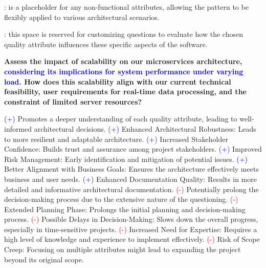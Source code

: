 : is a placeholder for any non-functional attributes, allowing the pattern to be flexibly applied to various architectural scenarios.

: this space is reserved for customizing questions to evaluate how the chosen quality attribute influences these specific aspects of the software.
       
 \textbf{\textcolor{mycolorgreen}{Assess the impact of scalability on our microservices architecture}, \textcolor{blue}{considering its implications for system performance under varying load.} How does this scalability align with our current technical feasibility, user requirements for real-time data processing, and the constraint of limited server resources?}

\newline
\textcolor{blue}{(+)} Promotes a deeper understanding of each quality attribute, leading to well-informed architectural decisions. \newline
\textcolor{blue}{(+)} Enhanced Architectural Robustness: Leads to more resilient and adaptable architecture. \newline
\textcolor{blue}{(+)} Increased Stakeholder Confidence: Builds trust and assurance among project stakeholders. \newline
\textcolor{blue}{(+)} Improved Risk Management: Early identification and mitigation of potential issues. \newline
\textcolor{blue}{(+)} Better Alignment with Business Goals: Ensures the architecture effectively meets business and user needs. \newline
\textcolor{blue}{(+)} Enhanced Documentation Quality: Results in more detailed and informative architectural documentation. \newline
\textcolor{red}{(-)} Potentially prolong the decision-making process due to the extensive nature of the questioning. \newline
\textcolor{red}{(-)} Extended Planning Phase: Prolongs the initial planning and decision-making process. \newline
\textcolor{red}{(-)} Possible Delays in Decision-Making: Slows down the overall progress, especially in time-sensitive projects. \newline
\textcolor{red}{(-)} Increased Need for Expertise: Requires a high level of knowledge and experience to implement effectively. \newline
\textcolor{red}{(-)} Risk of Scope Creep: Focusing on multiple attributes might lead to expanding the project beyond its original scope. \newline


